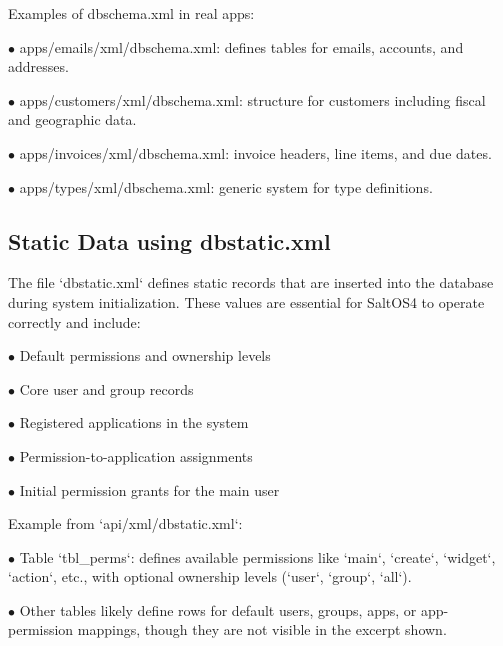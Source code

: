 \documentclass[a4paper]{article}
\begin{document}
Examples of dbschema.xml in real apps:

\begin{compactitem}
\item[\color{myblue}$\bullet$] apps/emails/xml/dbschema.xml: defines tables for emails, accounts, and addresses.
\item[\color{myblue}$\bullet$] apps/customers/xml/dbschema.xml: structure for customers including fiscal and geographic data.
\item[\color{myblue}$\bullet$] apps/invoices/xml/dbschema.xml: invoice headers, line items, and due dates.
\item[\color{myblue}$\bullet$] apps/types/xml/dbschema.xml: generic system for type definitions.
\end{compactitem}

\hypertarget{toc40}{}
\subsection{Static Data using dbstatic.xml}

The file `dbstatic.xml` defines static records that are inserted into the database during system initialization. These values are essential for SaltOS4 to operate correctly and include:

\begin{compactitem}
\item[\color{myblue}$\bullet$] Default permissions and ownership levels
\item[\color{myblue}$\bullet$] Core user and group records
\item[\color{myblue}$\bullet$] Registered applications in the system
\item[\color{myblue}$\bullet$] Permission-to-application assignments
\item[\color{myblue}$\bullet$] Initial permission grants for the main user
\end{compactitem}

Example from `api/xml/dbstatic.xml`:

\begin{compactitem}
\item[\color{myblue}$\bullet$] Table `tbl\_perms`: defines available permissions like `main`, `create`, `widget`, `action`, etc., with optional ownership levels (`user`, `group`, `all`).
\item[\color{myblue}$\bullet$] Other tables likely define rows for default users, groups, apps, or app-permission mappings, though they are not visible in the excerpt shown.
\end{compactitem}
\end{document}

